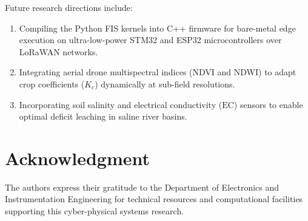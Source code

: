 \documentclass[conference]{IEEEtran}
\begin{document}
Future research directions include:
\begin{enumerate}
    \item Compiling the Python FIS kernels into C++ firmware for bare-metal edge execution on ultra-low-power STM32 and ESP32 microcontrollers over LoRaWAN networks.
    \item Integrating aerial drone multispectral indices (NDVI and NDWI) to adapt crop coefficients ($K_c$) dynamically at sub-field resolutions.
    \item Incorporating soil salinity and electrical conductivity ($\text{EC}$) sensors to enable optimal deficit leaching in saline river basins.
\end{enumerate}

\section*{Acknowledgment}
The authors express their gratitude to the Department of Electronics and Instrumentation Engineering for technical resources and computational facilities supporting this cyber-physical systems research.



\end{document}
